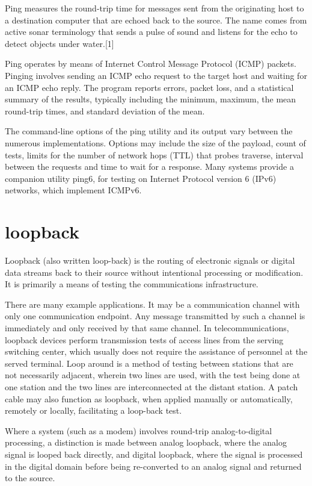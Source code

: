 \documentclass[a4paper,12pt]{book}
\begin{document}
Ping measures the round-trip time for messages sent from the originating host to a destination computer that are echoed back to the source. The name comes from active sonar terminology that sends a pulse of sound and listens for the echo to detect objects under water.[1]

Ping operates by means of Internet Control Message Protocol (ICMP) packets. Pinging involves sending an ICMP echo request to the target host and waiting for an ICMP echo reply. The program reports errors, packet loss, and a statistical summary of the results, typically including the minimum, maximum, the mean round-trip times, and standard deviation of the mean.

The command-line options of the ping utility and its output vary between the numerous implementations. Options may include the size of the payload, count of tests, limits for the number of network hops (TTL) that probes traverse, interval between the requests and time to wait for a response. Many systems provide a companion utility ping6, for testing on Internet Protocol version 6 (IPv6) networks, which implement ICMPv6.

\section{loopback}
Loopback (also written loop-back) is the routing of electronic signals or digital data streams back to their source without intentional processing or modification. It is primarily a means of testing the communications infrastructure.

There are many example applications. It may be a communication channel with only one communication endpoint. Any message transmitted by such a channel is immediately and only received by that same channel. In telecommunications, loopback devices perform transmission tests of access lines from the serving switching center, which usually does not require the assistance of personnel at the served terminal. Loop around is a method of testing between stations that are not necessarily adjacent, wherein two lines are used, with the test being done at one station and the two lines are interconnected at the distant station. A patch cable may also function as loopback, when applied manually or automatically, remotely or locally, facilitating a loop-back test.

Where a system (such as a modem) involves round-trip analog-to-digital processing, a distinction is made between analog loopback, where the analog signal is looped back directly, and digital loopback, where the signal is processed in the digital domain before being re-converted to an analog signal and returned to the source.
\end{document}
